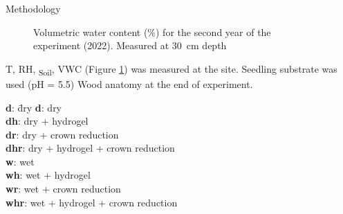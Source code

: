 \documentclass[final]{beamer}
\newlength{\sepwidth}
\newlength{\colwidth}
\newcommand{\separatorcolumn}{\begin{column}{\sepwidth}\end{column}}
\begin{document}
\begin{frame}[t]
\begin{columns}[t]
\begin{column}{\colwidth}
\begin{block}{Methodology}
    \begin{minipage}[t]{0.45\textwidth}
        \begin{figure}
            
            \caption{Volumetric water content (\%) for the second year of the experiment (2022). Measured at \SI{30}{\centi\meter} depth}
            \label{fig:vwc}
        \end{figure}
    \end{minipage}\hfill
    \begin{minipage}[t]{0.45\textwidth}
        T, RH, \Psi\textsubscript{Soil}, VWC (Figure \ref{fig:vwc}) was measured at the site. Seedling substrate was used (pH = 5.5) Wood anatomy at the end of experiment.
        \begin{tabbing}
            \textbf{d}: \quad\= dry \kill
            \textbf{d}: \>  dry \\
            \textbf{dh}: \>  dry + hydrogel \\
            \textbf{dr}: \>  dry + crown reduction\\
            \textbf{dhr}: \>  dry + hydrogel + crown reduction \\
            \textbf{w}: \>  wet \\
            \textbf{wh}: \>  wet + hydrogel \\
            \textbf{wr}: \>  wet + crown reduction\\
            \textbf{whr}: \>  wet + hydrogel + crown reduction
        \end{tabbing}
    \end{minipage}\hfill
\end{block}

\end{column}


\begin{column}{\colwidth}


\end{column}
\end{columns}
\end{frame}
\end{document}
